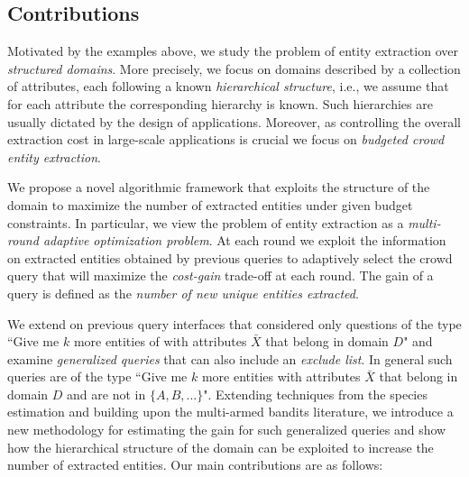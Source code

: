 \subsection{Contributions}
\label{sec:contributions}
Motivated by the examples above, we study the problem of entity extraction over {\em structured domains}. More precisely, we focus on domains described by a collection of attributes, each following a known {\em hierarchical structure}, i.e., we assume that for each attribute the corresponding hierarchy is known. Such hierarchies are usually dictated by the design of applications. \iftr Moreover, as controlling the overall extraction cost in large-scale applications is crucial we focus on {\em budgeted crowd entity extraction}. \fi

We propose a novel algorithmic framework that exploits the structure of the domain to maximize the number of extracted entities under given budget constraints. In particular, we view the problem of entity extraction as a {\em multi-round adaptive optimization problem}. At  each round we exploit the information on extracted entities obtained by previous queries to adaptively select the crowd query that will maximize the {\em cost-gain} trade-off at each round. The gain of a query is defined as the {\em number of new unique entities extracted}. 

We extend on previous query interfaces that considered only questions of the type ``Give me $k$ more entities of with attributes $\bar{X}$ that belong in domain $D$" and examine {\em generalized queries} that can also include an {\em exclude list}. In general such queries are of the type ``Give me $k$ more entities with attributes $\bar{X}$ that belong in domain $D$ and are not in $\{A, B, ...\}$". Extending techniques from the species estimation and building upon the multi-armed bandits literature, we introduce a new methodology for estimating the gain for such generalized queries and show how the hierarchical structure of the domain can be exploited to increase the number of extracted entities. Our main contributions are as follows:

